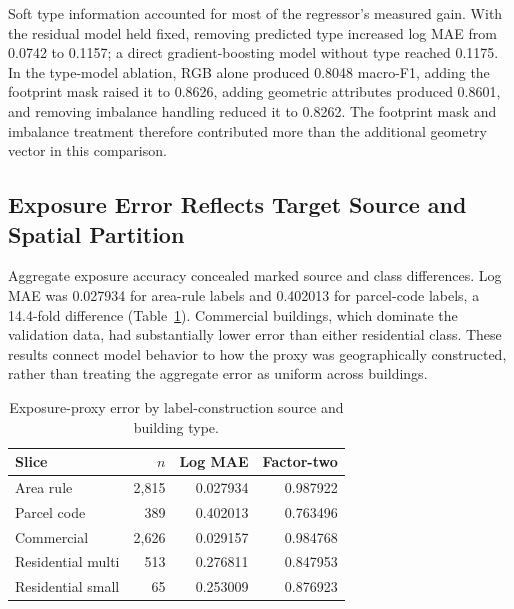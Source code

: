 Soft type information accounted for most of the regressor's measured gain. With the residual model held fixed, removing predicted type increased log MAE from 0.0742 to 0.1157; a direct gradient-boosting model without type reached 0.1175. In the type-model ablation, RGB alone produced 0.8048 macro-F1, adding the footprint mask raised it to 0.8626, adding geometric attributes produced 0.8601, and removing imbalance handling reduced it to 0.8262. The footprint mask and imbalance treatment therefore contributed more than the additional geometry vector in this comparison.


\subsection{Exposure Error Reflects Target Source and Spatial Partition}
\label{sec:exp_stage2a_sensitivity}

Aggregate exposure accuracy concealed marked source and class differences. Log MAE was 0.027934 for area-rule labels and 0.402013 for parcel-code labels, a 14.4-fold difference (Table~\ref{tab:stage2a_subgroups}). Commercial buildings, which dominate the validation data, had substantially lower error than either residential class. These results connect model behavior to how the proxy was geographically constructed, rather than treating the aggregate error as uniform across buildings.

\begin{table}[t]
\centering
\caption{Exposure-proxy error by label-construction source and building type.}
\label{tab:stage2a_subgroups}
\small
\begin{tabular}{lrrr}
\toprule
Slice & $n$ & Log MAE & Factor-two \\
\midrule
Area rule & 2,815 & 0.027934 & 0.987922 \\
Parcel code & 389 & 0.402013 & 0.763496 \\
Commercial & 2,626 & 0.029157 & 0.984768 \\
Residential multi & 513 & 0.276811 & 0.847953 \\
Residential small & 65 & 0.253009 & 0.876923 \\
\bottomrule
\end{tabular}
\end{table}


